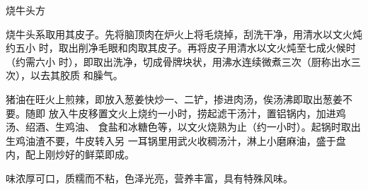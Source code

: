 %
%
%
%
%
%
%
\begin{recipe}{烧牛头方}

\ingredients


\preparation

烧牛头系取用其皮子。先将脑顶肉在炉火上将毛烧掉，刮洗干净，用清水以文火炖约五小
时，取出削净毛眼和肉取其皮子。再将皮子用清水以文火炖至七成火候时（约需六小
时），即取出洗净，切成骨牌块状，用沸水连续微煮三次（厨称出水三次），以去其胶质
和臊气。

猪油在旺火上煎辣，即放入葱姜快炒一、二铲，掺进肉汤，俟汤沸即取出葱姜不要。随即
放入牛皮移置文火上烧约一小时，捞起滤干汤汁，置铝锅内，加进鸡汤、绍酒、生鸡油、
食盐和冰糖色等，以文火烧熟为止（约一小时）。起锅时取出生鸡油渣不要，牛皮转入另
一耳锅里用武火收稠汤汁，淋上小磨麻油，盛于盘内，配上刚炒好的鲜菜即成。

\features

味浓厚可口，质糯而不粘，色泽光亮，营养丰富，具有特殊风味。

\end{recipe}

